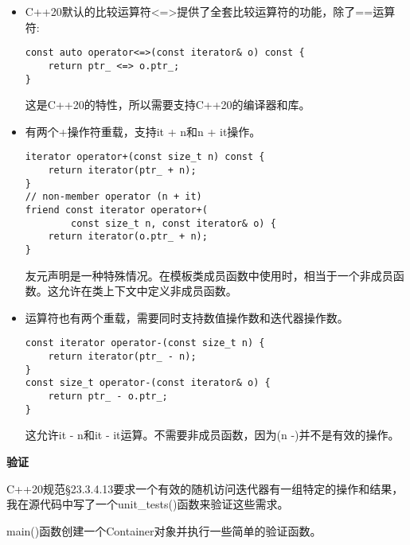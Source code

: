 \begin{itemize}
\item 
C++20默认的比较运算符<=>提供了全套比较运算符的功能，除了==运算符:

\begin{lstlisting}[style=styleCXX]
const auto operator<=>(const iterator& o) const {
	return ptr_ <=> o.ptr_;
}
\end{lstlisting}

这是C++20的特性，所以需要支持C++20的编译器和库。

\item 
有两个+操作符重载，支持it + n和n + it操作。

\begin{lstlisting}[style=styleCXX]
iterator operator+(const size_t n) const {
	return iterator(ptr_ + n);
}
// non-member operator (n + it)
friend const iterator operator+(
		const size_t n, const iterator& o) {
	return iterator(o.ptr_ + n);
}
\end{lstlisting}

友元声明是一种特殊情况。在模板类成员函数中使用时，相当于一个非成员函数。这允许在类上下文中定义非成员函数。

\item 
运算符也有两个重载，需要同时支持数值操作数和迭代器操作数。

\begin{lstlisting}[style=styleCXX]
const iterator operator-(const size_t n) {
	return iterator(ptr_ - n);
}
const size_t operator-(const iterator& o) {
	return ptr_ - o.ptr_;
}
\end{lstlisting}

这允许it - n和it - it运算。不需要非成员函数，因为(n -)并不是有效的操作。

\end{itemize}


\noindent
\textbf{验证}

C++20规范§23.3.4.13要求一个有效的随机访问迭代器有一组特定的操作和结果，我在源代码中写了一个unit\_tests()函数来验证这些需求。

main()函数创建一个Container对象并执行一些简单的验证函数。

